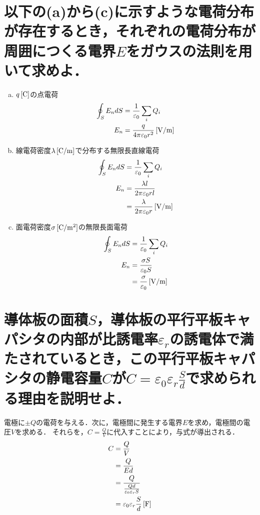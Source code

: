 \documentclass[dvipdfmx]{ujarticle}
\begin{document}
\section{以下の(a)から(c)に示すような電荷分布が存在するとき，それぞれの電荷分布が周囲につくる電界$E$をガウスの法則を用いて求めよ．}
\begin{enumerate}[(a)]
	\item $q\,[\rm{C}]$の点電荷
	\begin{align*}
		\oint_{S} E_{n} dS&=\frac{1}{\varepsilon_{0}} \sum_{i} Q_{i}\\
		E_{n}&=\frac{q}{4\pi \varepsilon_{0} r^{2}}\,[\rm{V/m}]
	\end{align*}
	\item 線電荷密度$\lambda\,[\rm{C/m}]$で分布する無限長直線電荷
	\begin{align*}
		\oint_{S} E_{n} dS&=\frac{1}{\varepsilon_{0}} \sum_{i} Q_{i}\\
		E_{n}&=\frac{\lambda l}{2\pi \varepsilon_{0}r l}\\
		&=\frac{\lambda}{2\pi \varepsilon_{0}r}\,[\rm{V/m}]
	\end{align*}
	\item 面電荷密度$\sigma\,[\rm{C/m^{2}}]$の無限長面電荷
	\begin{align*}
		\oint_{S} E_{n} dS&=\frac{1}{\varepsilon_{0}} \sum_{i} Q_{i}\\
		E_{n}&=\frac{\sigma S}{\varepsilon_{0}S}\\
		&=\frac{\sigma}{\varepsilon_{0}}\,[\rm{V/m}]
	\end{align*}
\end{enumerate}

\section{導体板の面積$S$，導体板の平行平板キャパシタの内部が比誘電率$\varepsilon_{r}$の誘電体で満たされているとき，この平行平板キャパシタの静電容量$C$が$C=\varepsilon_{0}\varepsilon_{r}\frac{S}{d}$で求められる理由を説明せよ．}
電極に$\pm Q$の電荷を与える．次に，電極間に発生する電界$E$を求め，電極間の電圧$V$を求める．
それらを，$C=\frac{Q}{V}$に代入すことにより，与式が導出される．
\begin{align*}
	C&=\frac{Q}{V}\\
	&=\frac{Q}{Ed}\\
	&=\frac{Q}{\frac{Qd}{\varepsilon_{0}\varepsilon_{r}S}}\\
	&=\varepsilon_{0}\varepsilon_{r}\frac{S}{d}\,[\rm{F}]
\end{align*}
\end{document}

